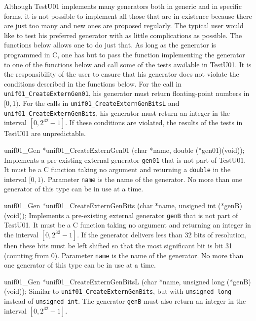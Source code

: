 
Although  TestU01 implements many generators both in generic and in
specific forms, it is not possible to implement all those that are in
existence because there are just too many and new ones are proposed 
regularly. The typical user would like to test his preferred generator
with as little complications as possible. The functions below allows one 
to do just that. As long as the generator is programmed in C, 
one has but to pass  the function implementing the generator to one of the
functions below and call some of the tests available in TestU01.
It is the responsibility of the user to ensure that his generator does not
violate the conditions described in the functions below. For the
call in {\tt unif01\_CreateExternGen01}, his generator must return
floating-point numbers in $[0, 1)$. For the calls in
 {\tt unif01\_CreateExternGenBitsL} and  {\tt unif01\_CreateExternGenBits},
 his generator must return an integer in the interval $[0, 2^{32} - 1]$.
If these conditions are violated, the results of the tests in TestU01 are
unpredictable. %
\code


unif01_Gen *unif01_CreateExternGen01 (char *name, double (*gen01)(void));
\endcode
\tab Implements a pre-existing external generator {\tt gen01} that is
  not part of TestU01. \label{externgen}
 It must be a C function taking no argument and returning a {\tt double}
 in the interval $[0, 1)$. Parameter {\tt name} is the name of the generator.
 No more than one generator of this type can be in use at a  time. 
\endtab
\code


unif01_Gen *unif01_CreateExternGenBits (char *name,
                                        unsigned int (*genB)(void));
\endcode
\tab Implements a pre-existing external generator {\tt genB} that is not part
 of TestU01. It must be a C function taking no argument and returning
 an integer in the interval $[0, 2^{32} - 1]$.
 If the generator delivers less than 32 bits of resolution, then these 
 bits must be left shifted so that the most significant bit is bit 31
 (counting from 0). Parameter {\tt name} is the name of the generator.
 No more than one generator of this type can be in use at a  time. 
 \endtab
\code


unif01_Gen *unif01_CreateExternGenBitsL (char *name,
                                         unsigned long (*genB)(void));
\endcode
\tab Similar to {\tt unif01\_CreateExternGenBits}, but with
{\tt unsigned long} instead of {\tt unsigned int}. The generator 
{\tt genB} must also return  an integer in the interval $[0, 2^{32} - 1]$.
 \endtab
\code


